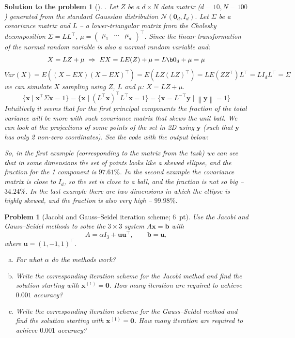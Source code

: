 \documentclass[12pt,a4]{article}
\newtheorem{problem}{Problem}
\newtheorem{solution}{Solution to the problem}
\newcommand{\bb}{{\mathbf b}}
\newcommand{\bu}{{\mathbf u}}
\newcommand{\bx}{{\mathbf x}}
\newcommand{\by}{{\mathbf y}}
\newcommand{\norm}[1]{\left\lVert#1\right\rVert}
\begin{document}
\begin{solution}[] \rm .
Let $Z$ be a $d \times N$ data matrix ($d = 10, N=100$) generated from the standard Gaussian distribution $\mathcal N(\mathbf0_d,I_d)$. Let $\Sigma$ be a covariance matrix and $L$ -- a lower-triangular matrix from the Cholesky decomposition $\Sigma = LL^\top$, $\mu = \begin{pmatrix}\mu_1 & \cdots & \mu_d \end{pmatrix}^\top$. Since the linear transformation of the normal random variable is also a normal random variable and:
\[
X = LZ+\mu
~\Rightarrow~
EX = LE(Z)+\mu = L\b0_d+\mu = \mu
\]
\[
Var(X) = E((X - EX)(X - EX)^\top)= E(LZ (LZ)^\top) = L E(Z Z^\top)L^\top = L I_d L^\top = \Sigma
\]
we can simulate $X$ sampling using $Z$, $L$ and $\mu$: $X = LZ+\mu$.
\[
\{\bx \mid \bx^\top \Sigma \bx = 1\} = \{\bx \mid (L^\top\bx)^\top L^\top \bx = 1\} = \{\bx = L^{-\top}\by \mid \norm{\by} = 1\}
\]
Intuitively it seems that for the first principal components the fraction of the total variance will be more with such covariance matrix that skews the unit ball.
We can look at the projections of some points of the set in 2D using $\by$ (such that $\by$ has only 2 non-zero coordinates). See the code with the output below:

So, in the first example (corresponding to the matrix from the task) we can see that in some dimensions the set of points looks like a skewed ellipse, and the fraction for the 1 component is $97.61\%$. In the second example the covariance matrix is close to $I_d$, so the set is close to a ball, and the fraction is not so big -- $34.24\%$. In the last example there are two dimensions in which the ellipse is highly skewed, and the fraction is also very high -- $99.98\% $.\\
\end{solution}


\begin{problem}[Jacobi and Gauss--Seidel iteration scheme; 6~pt]\rm
	Use the Jacobi and Gauss--Seidel methods to solve the $3\times 3$ system $A\bx = \bb$ with 
	\[
		A = \alpha I_3 + \bu \bu^\top, \qquad \bb = \bu,
	\]
	where $\bu = (1, -1, 1)^\top$. 
	\begin{enumerate}[(a)]
		\item For what $\alpha$ do the methods work?
		\item Write the corresponding iteration scheme for the Jacobi method and find the solution starting with $\bx^{(1)} = \mathbf{0}$. How many iteration are required to achieve $0.001$ accuracy? 
		\item Write the corresponding iteration scheme for the Gauss--Seidel method and find the solution starting with $\bx^{(1)} = \mathbf{0}$. How many iteration are required to achieve $0.001$ accuracy? 
	\end{enumerate}		
		
\end{problem}
\end{document}

